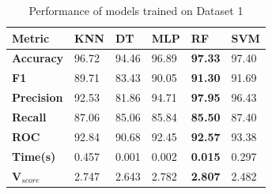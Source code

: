 \begin{table}[H]
  \centering
  \caption{Performance of models trained on Dataset 1}\label{tab:performance_of_models_trained_on_dataset_1}
  \begin{tabular}{|p{5em}|C{3em}|C{3em}|C{3em}|C{3em}|C{3em}|}
    \hline
    \textbf{Metric}      & \textbf{KNN} & \textbf{DT} & \textbf{MLP} & \textbf{RF}    & \textbf{SVM} \\
    \hline
    \textbf{Accuracy}    & 96.72        & 94.46       & 96.89        & \textbf{97.33} & 97.40        \\
    \textbf{F1}          & 89.71        & 83.43       & 90.05        & \textbf{91.30} & 91.69        \\
    \textbf{Precision}   & 92.53        & 81.86       & 94.71        & \textbf{97.95} & 96.43        \\
    \textbf{Recall}      & 87.06        & 85.06       & 85.84        & \textbf{85.50} & 87.40        \\
    \textbf{ROC}         & 92.84        & 90.68       & 92.45        & \textbf{92.57} & 93.38        \\
    \textbf{Time(s)}     & 0.457        & 0.001       & 0.002        & \textbf{0.015} & 0.297        \\
    \hline
    \textbf{V$_{score}$} & 2.747        & 2.643       & 2.782        & \textbf{2.807} & 2.482        \\
    \hline
  \end{tabular}
\end{table}

